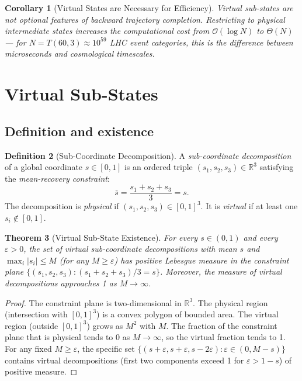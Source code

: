 \documentclass[twocolumn,10pt,a4paper]{article}
\theoremstyle{thmstyle}
\newtheorem{theorem}{Theorem}[section]
\newtheorem{corollary}[theorem]{Corollary}
\theoremstyle{definition}
\newtheorem{definition}[theorem]{Definition}
\theoremstyle{remark}
\newcommand{\R}{\mathbb{R}}
\begin{document}
\begin{corollary}[Virtual States are Necessary for Efficiency]
\label{cor:virtual_necessary}
Virtual sub-states are not optional features of backward trajectory completion.
Restricting to physical intermediate states increases the computational
cost from $\mathcal{O}(\log N)$ to $\Theta(N)$ — for $N = T(60,3) \approx
10^{59}$ LHC event categories, this is the difference between microseconds
and cosmological timescales.
\end{corollary}

\section{Virtual Sub-States}
\label{sec:virtual}

\subsection{Definition and existence}

\begin{definition}[Sub-Coordinate Decomposition]
\label{def:sub_coord}
A \emph{sub-coordinate decomposition} of a global coordinate $s \in [0,1]$
is an ordered triple $(s_1, s_2, s_3) \in \R^3$ satisfying the
\emph{mean-recovery constraint}:
\[
\bar s = \frac{s_1 + s_2 + s_3}{3} = s.
\]
The decomposition is \emph{physical} if $(s_1, s_2, s_3) \in [0,1]^3$.
It is \emph{virtual} if at least one $s_i \notin [0,1]$.
\end{definition}

\begin{theorem}[Virtual Sub-State Existence]
\label{thm:virtual_existence}
For every $s \in (0,1)$ and every $\varepsilon > 0$, the set of virtual
sub-coordinate decompositions with mean $s$ and
$\max_i |s_i| \leq M$ (for any $M \geq \varepsilon$) has positive
Lebesgue measure in the constraint plane
$\{(s_1,s_2,s_3) : (s_1+s_2+s_3)/3 = s\}$.
Moreover, the measure of virtual decompositions approaches 1 as $M \to \infty$.
\end{theorem}

\begin{proof}
The constraint plane is two-dimensional in $\R^3$. The physical region
(intersection with $[0,1]^3$) is a convex polygon of bounded area.
The virtual region (outside $[0,1]^3$) grows as $M^2$ with $M$.
The fraction of the constraint plane that is physical tends to 0 as $M \to \infty$,
so the virtual fraction tends to 1.
For any fixed $M \geq \varepsilon$, the specific set
$\{(s+\varepsilon, s+\varepsilon, s-2\varepsilon) : \varepsilon \in (0, M-s)\}$
contains virtual decompositions (first two components exceed 1 for
$\varepsilon > 1-s$) of positive measure.
\end{proof}
\end{document}
